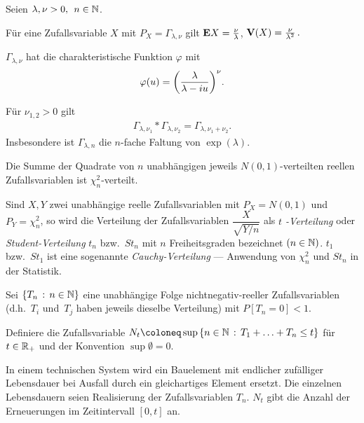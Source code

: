 \begin{prop}
\label{prop:7.7}
Seien $\lambda, \nu  >0,\;\, n\in \mathbb{N}$.
\begin{propenum}
\item
Für eine Zufallsvariable $X$ mit $P_{X}=\Gamma _{\lambda, \nu}$ gilt $\textbf{E} X
=\frac{\nu}{\lambda}$, $\textbf{V}(X) = \frac{\nu}{\lambda ^ {2}}\, .$
\item
$\Gamma _{\lambda , \nu}$ hat die charakteristische Funktion $\varphi $ mit
\begin{align*}
\varphi(u) = {\displaystyle\left( \frac{\lambda }{\lambda -iu}\right)^ {\nu}}.
\end{align*}
\item
Für $\nu _{1,2} >0$ gilt
\begin{align*}
\Gamma _{\lambda , \nu _{1}}\ast \Gamma _{\lambda , \nu _{2}} = \Gamma _{\lambda
, \nu _{1}+\nu_{2}}.
\end{align*}
Insbesondere ist $\Gamma _{\lambda , n }$ die $n$-fache Faltung von $\exp
(\lambda )$.
\item
Die Summe der Quadrate von $n$ unabhängigen jeweils $N(0,1)$-verteilten reellen
Zufallsvariablen ist $\chi^ {2}_{n}$-verteilt.\fishhere
\end{propenum}
\end{prop}

\begin{bem}
\label{bem:7.7}
Sind $X,Y$ zwei unabhängige reelle Zufallsvariablen mit $P_{X}=N(0,1)$
und $P_{Y}=\chi ^ {2}_{n}$, so wird die Verteilung der Zufallsvariablen
$\dfrac{X}{\sqrt{Y/n}}$ als \emph{$t$
-Verteilung} oder \emph{Student-Verteilung} $t_n$ bzw.\ $St_{n}$  mit $n$
Freiheitsgraden bezeichnet $(n\in \mathbb{N})$.
$t_1$ bzw.\ $St_{1}$ ist eine sogenannte \emph{Cauchy-Verteilung}
--- Anwendung von $\chi^ {2}_{n}$ und $St_{n}$ in der Statistik.\maphere
\end{bem}

Sei $\left\{ T_{n}\,:\,n\in \mathbb{N}\right\}$ eine unabhängige Folge
nichtnegativ-reeller Zufallsvariablen
(d.h.\ $T_{i}$ und~$T_{j}$ haben jeweils dieselbe Verteilung)
mit $P[T_{n}=0] < 1$.

Definiere die Zufallsvariable 
$N_{t}\defl \sup \setdef{n\in \N}{T_{1} +\ldots +T_{n} \leq t}$ für $t\in\mathbb{R}_{+}$
und der Konvention $\sup \emptyset = 0$.

\begin{bsp}
In einem technischen System wird ein Bauelement mit endlicher
zufälliger Lebensdauer bei Ausfall durch ein gleichartiges Element ersetzt. Die
einzelnen Lebensdauern seien Realisierung der Zufallsvariablen $T_{n}$. $N_{t}$ gibt die
Anzahl der Erneuerungen im Zeitintervall $[0,t]$ an.\bsphere
\end{bsp}

